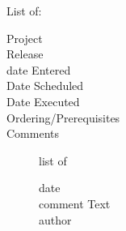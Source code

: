 \documentclass[SDSUThesis.tex]{subfiles}
\begin{document}
    List of:
    \begin{description}
      \item[Project] 
      \item[Release]
      \item[date Entered]
      \item[Date Scheduled]
      \item[Date Executed]
      \item[Ordering/Prerequisites]
      \item[Comments] list of \\
      \begin{description}
        \item[date]
        \item[comment Text]
        \item[author]
      \end{description}
    \end{description}
\end{document}
